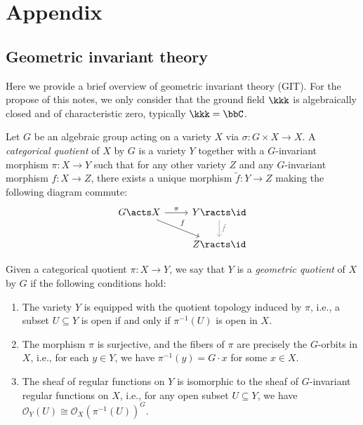 \section{Appendix}


\subsection{Geometric invariant theory}

Here we provide a brief overview of geometric invariant theory (GIT).
For the propose of this notes, we only consider that the ground field $\kkk$ is algebraically closed and of characteristic zero, typically $\kkk = \bbC$.

\begin{definition}
	Let $G$ be an algebraic group acting on a variety $X$ via $\sigma: G \times X \to X$.
	A \emph{categorical quotient} of $X$ by $G$ is a variety $Y$ together with a $G$-invariant morphism $\pi: X \to Y$ such that for any other variety $Z$ and any $G$-invariant morphism $f: X \to Z$, there exists a unique morphism $\tilde{f}: Y \to Z$ making the following diagram commute:
	\[
		\begin{tikzcd}
			G \acts X & Y \racts \id \\
			& Z \racts \id
			\arrow[from=1-1, to=1-2, "\pi"]
			\arrow[from=1-2, to=2-2, "\tilde{f}", gray]
			\arrow[from=1-1, to=2-2, "f"]
		\end{tikzcd}
	\]

	Given a categorical quotient $\pi: X \to Y$, we say that $Y$ is a \emph{geometric quotient} of $X$ by $G$ if the following conditions hold:
	\begin{enumerate}
		\item The variety $Y$ is equipped with the quotient topology induced by $\pi$, i.e., a subset $U \subseteq Y$ is open if and only if $\pi^{-1}(U)$ is open in $X$.
		\item The morphism $\pi$ is surjective, and the fibers of $\pi$ are precisely the $G$-orbits in $X$, i.e., for each $y \in Y$, we have $\pi^{-1}(y) = G \cdot x$ for some $x \in X$.
		\item The sheaf of regular functions on $Y$ is isomorphic to the sheaf of $G$-invariant regular functions on $X$, i.e., for any open subset $U \subseteq Y$, we have $\mathcal{O}_Y(U) \cong \mathcal{O}_X(\pi^{-1}(U))^G$.
	\end{enumerate}
\end{definition}


